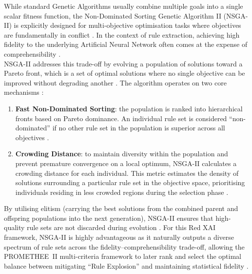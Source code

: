 \label{ssub:nsga}

While standard Genetic Algorithms usually combine multiple goals into a single scalar fitness function,
the Non-Dominated Sorting Genetic Algorithm II (NSGA-II) is explicitly designed for multi-objective
optimisation tasks where objectives are fundamentally in conflict \cite{Deb2002}. In the context of
rule extraction, achieving high fidelity to the underlying Artificial Neural Network often comes at the
expense of comprehensibility \cite{Yedjour2024}.
\\
NSGA-II addresses this trade-off by evolving a population of solutions toward a Pareto front, which is a
set of optimal solutions where no single objective can be improved without degrading another
\cite{Deb2002}. The algorithm operates on two core mechanisms \cite{Deb2002}:
\begin{enumerate}
    \item \textbf{Fast Non-Dominated Sorting}: the population is ranked into hierarchical fronts based on Pareto dominance. An individual rule set is considered ``non-dominated'' if no other rule set in the population is superior across all objectives \cite{Deb2002}.
    \item \textbf{Crowding Distance}: to maintain diversity within the population and prevent premature convergence on a local optimum, NSGA-II calculates a crowding distance for each individual. This metric estimates the density of solutions surrounding a particular rule set in the objective space, prioritising individuals residing in less crowded regions during the selection phase \cite{Deb2002}.
\end{enumerate}

By utilising elitism (carrying the best solutions from the combined parent and offspring populations
into the next generation), NSGA-II ensures that high-quality rule sets are not discarded during
evolution \cite{Deb2002, Yedjour2024}. For this Red XAI framework, NSGA-II is highly advantageous as it
naturally outputs a diverse spectrum of rule sets across the fidelity--comprehensibility trade-off,
allowing the PROMETHEE~II multi-criteria framework to later rank and select the optimal balance between
mitigating ``Rule Explosion'' and maintaining statistical fidelity \cite{Yedjour2024, Brans1985}.